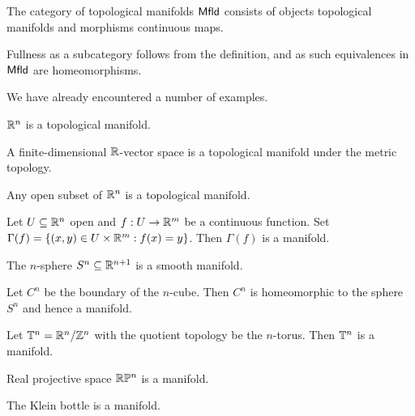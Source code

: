 \begin{definition}\label{def: category of topological manifolds}
    The category of topological manifolds $\mathsf{Mfld}$ consists of objects topological manifolds and morphisms continuous maps. 
\end{definition}
\begin{remark}\label{rmk: mfld is a full subcategory}
    Fullness as a subcategory follows from the definition, and as such equivalences in $\mathsf{Mfld}$ are homeomorphisms. 
\end{remark}
We have already encountered a number of examples. 
\begin{example}\label{ex: Rn is a mfld}
    $\mathbb{R}^{n}$ is a topological manifold. 
\end{example}
\begin{example}\label{ex: fd real vs is a mfld}
    A finite-dimensional $\mathbb{R}$-vector space is a topological manifold under the metric topology. 
\end{example}
\begin{example}\label{ex: open subsets of Rn are mflds}
    Any open subset of $\mathbb{R}^{n}$ is a topological manifold. 
\end{example}
\begin{example}\label{ex: graphs are mflds}
    Let $U\subseteq\mathbb{R}^{n}$ open and $f:U\to\mathbb{R}^{m}$ be a continuous function. Set $\Gamma(f)=\{(x,y)\in U\times\mathbb{R}^{m}:f(x)=y\}$. Then $\Gamma(f)$ is a manifold. 
\end{example}
\begin{example}\label{ex: spheres are mflds}
    The $n$-sphere $S^{n}\subseteq\mathbb{R}^{n+1}$ is a smooth manifold. 
\end{example}
\begin{example}\label{ex: boundary of cube is mfld}
    Let $C^{n}$ be the boundary of the $n$-cube. Then $C^{n}$ is homeomorphic to the sphere $S^{n}$ and hence a manifold. 
\end{example}
\begin{example}\label{ex: torus is mfld}
    Let $\mathbb{T}^{n}=\mathbb{R}^{n}/\mathbb{Z}^{n}$ with the quotient topology be the $n$-torus. Then $\mathbb{T}^{n}$ is a manifold. 
\end{example}
\begin{example}\label{ex: projective space is a mfld}
    Real projective space $\mathbb{R}\mathbb{P}^{n}$ is a manifold. 
\end{example}
\begin{example}\label{ex: klein bottle is a mfld}
    The Klein bottle is a manifold. 
\end{example}
